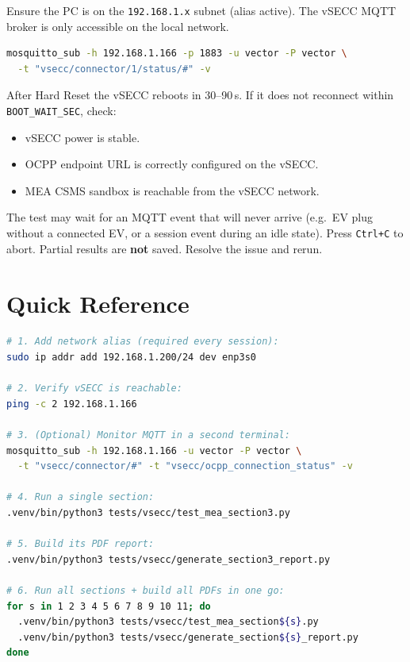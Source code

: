 \documentclass[11pt, a4paper]{article}
\begin{document}
\begin{tcolorbox}[noteboxstyle={MQTT events not received}]
Ensure the PC is on the \texttt{192.168.1.x} subnet (alias active).
The vSECC MQTT broker is only accessible on the local network.
\begin{lstlisting}[language=bash]
mosquitto_sub -h 192.168.1.166 -p 1883 -u vector -P vector \
  -t "vsecc/connector/1/status/#" -v
\end{lstlisting}
\end{tcolorbox}

\begin{tcolorbox}[noteboxstyle={Hard Reset --- vSECC does not reconnect}]
After Hard Reset the vSECC reboots in 30--90\,s.
If it does not reconnect within \texttt{BOOT\_WAIT\_SEC}, check:
\begin{itemize}[nosep]
  \item vSECC power is stable.
  \item OCPP endpoint URL is correctly configured on the vSECC.
  \item MEA CSMS sandbox is reachable from the vSECC network.
\end{itemize}
\end{tcolorbox}

\begin{tcolorbox}[tipboxstyle={Test hangs / Ctrl+C needed}]
The test may wait for an MQTT event that will never arrive
(e.g.\ EV plug without a connected EV, or a session event during
an idle state). Press \texttt{Ctrl+C} to abort.
Partial results are \textbf{not} saved.
Resolve the issue and rerun.
\end{tcolorbox}

\section{Quick Reference}

\begin{lstlisting}[language=bash, title={Complete session --- copy and paste}]
# 1. Add network alias (required every session):
sudo ip addr add 192.168.1.200/24 dev enp3s0

# 2. Verify vSECC is reachable:
ping -c 2 192.168.1.166

# 3. (Optional) Monitor MQTT in a second terminal:
mosquitto_sub -h 192.168.1.166 -u vector -P vector \
  -t "vsecc/connector/#" -t "vsecc/ocpp_connection_status" -v

# 4. Run a single section:
.venv/bin/python3 tests/vsecc/test_mea_section3.py

# 5. Build its PDF report:
.venv/bin/python3 tests/vsecc/generate_section3_report.py

# 6. Run all sections + build all PDFs in one go:
for s in 1 2 3 4 5 6 7 8 9 10 11; do
  .venv/bin/python3 tests/vsecc/test_mea_section${s}.py
  .venv/bin/python3 tests/vsecc/generate_section${s}_report.py
done
\end{lstlisting}
\end{document}
